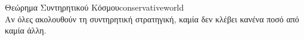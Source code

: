 {}
\begin{theoremgr}{Θεώρημα Συντηρητικού Κόσμου}{conservativeworld} \ \\
  Αν όλες ακολουθούν τη συντηρητική στρατηγική, καμία δεν κλέβει κανένα ποσό από καμία άλλη.
\end{theoremgr}

